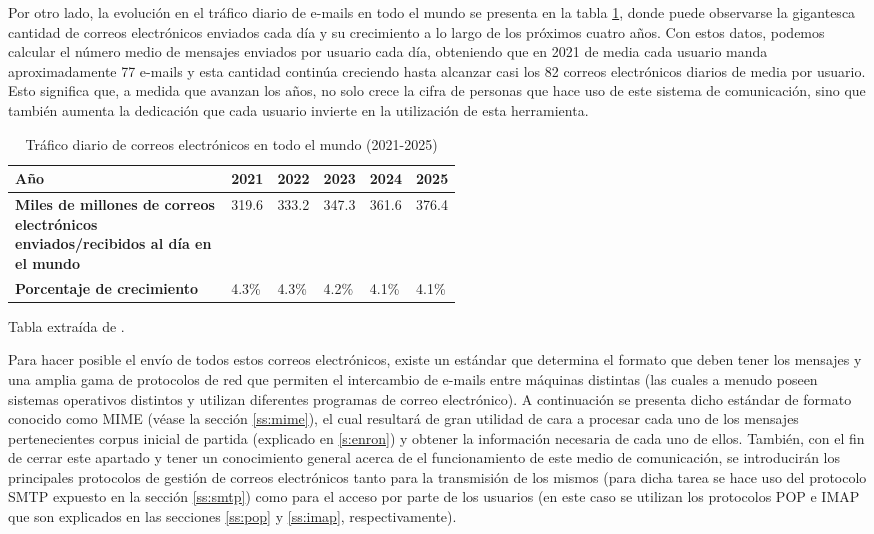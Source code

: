 Por otro lado, la evolución en el tráfico diario de e-mails en todo el mundo se presenta en la tabla \ref{tab:dailymail}, donde puede observarse la gigantesca cantidad de correos electrónicos enviados cada día y su crecimiento a lo largo de los próximos cuatro años. Con estos datos, podemos calcular el número medio de mensajes enviados por usuario cada día, obteniendo que en 2021 de media cada usuario manda aproximadamente 77 e-mails y esta cantidad continúa creciendo hasta alcanzar casi los 82 correos electrónicos diarios de media por usuario. Esto significa que, a medida que avanzan los años, no solo crece la cifra de personas que hace uso de este sistema de comunicación, sino que también aumenta la dedicación que cada usuario invierte en la utilización de esta herramienta.

\begin{table}[h]
	\centering
	\begin{tabular}{|p{0.52\linewidth}|l|l|l|l|l|}
		\hline
		\textbf{Año} & 2021 & 2022 & 2023 & 2024 & 2025 \\ \hline
		\textbf{Miles de millones de correos electrónicos enviados/recibidos al día en el mundo} & 319.6 & 333.2 & 347.3 & 361.6 & 376.4\\ \hline
		\textbf{Porcentaje de crecimiento} & 4.3\% & 4.3\% & 4.2\% & 4.1\% & 4.1\% \\ \hline
	\end{tabular}
	\caption{Tráfico diario de correos electrónicos en todo el mundo (2021-2025)}\label{tab:dailymail}
	Tabla extraída de \cite{radicati2020email}.
\end{table}

Para hacer posible el envío de todos estos correos electrónicos, existe un estándar que determina el formato que deben tener los mensajes y una amplia gama de protocolos de red que permiten el intercambio de e-mails entre máquinas distintas (las cuales a menudo poseen sistemas operativos distintos y utilizan diferentes programas de correo electrónico). A continuación se presenta dicho estándar de formato conocido como MIME (véase la sección \ref{ss:mime}), el cual resultará de gran utilidad de cara a procesar cada uno de los mensajes pertenecientes corpus inicial de partida (explicado en \ref{s:enron}) y obtener la información necesaria de cada uno de ellos. También, con el fin de cerrar este apartado y tener un conocimiento general acerca de el funcionamiento de este medio de comunicación, se introducirán los principales protocolos de gestión de correos electrónicos tanto para la transmisión de los mismos (para dicha tarea se hace uso del protocolo SMTP expuesto en la sección \ref{ss:smtp}) como para el acceso por parte de los usuarios (en este caso se utilizan los protocolos POP e IMAP que son explicados en las secciones \ref{ss:pop} y \ref{ss:imap}, respectivamente).

